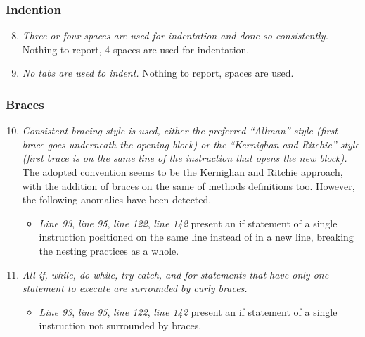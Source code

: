 	\subsubsection{Indention}
		\begin{enumerate}
			\setcounter{enumi}{7}
			\item \textit{Three or four spaces are used for indentation and done so consistently.}\newline
			Nothing to report, 4 spaces are used for indentation. %
			\item \textit{No tabs are used to indent.}\newline
			Nothing to report, spaces are used. %
		\end{enumerate}

	\subsubsection{Braces}
		\begin{enumerate}
			\setcounter{enumi}{9}
			\item \textit{Consistent bracing style is used, either the preferred “Allman” style (first brace goes underneath the opening block) or the “Kernighan and Ritchie” style (first brace is on the same line of the instruction that opens the new block).}\newline
			The adopted convention seems to be the Kernighan and Ritchie approach, with the addition of braces on the same of methods definitions too. However, the following anomalies have been detected.
			\begin{itemize}
				\item \textit{Line 93}, \textit{line 95}, \textit{line 122}, \textit{line 142} present an if statement of a single instruction positioned on the same line instead of in a new line, breaking the nesting practices as a whole.
			\end{itemize}

			\item \textit{All if, while, do-while, try-catch, and for statements that have only one statement to execute are surrounded by curly braces.}
			\begin{itemize}
				\item \textit{Line 93}, \textit{line 95}, \textit{line 122}, \textit{line 142} present an if statement of a single instruction not surrounded by braces.
			\end{itemize}
		\end{enumerate}

